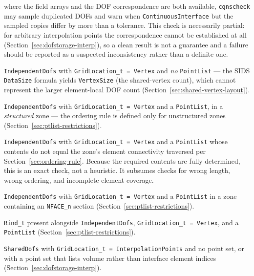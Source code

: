 \documentclass[11pt,letterpaper]{article}
\begin{document}
\begin{description}[leftmargin=2em]
\item[Warning, optional and off by default:] where the field arrays and
  the DOF correspondence are both available, \texttt{cgnscheck} may
  sample duplicated DOFs and warn when
  \texttt{ContinuousInterface} but the sampled copies
  differ by more than a tolerance.  This check is necessarily partial:
  for arbitrary interpolation points the correspondence cannot be
  established at all (Section~\ref{sec:dofstorage-interp}), so a clean
  result is not a guarantee and a failure should be reported as a
  suspected inconsistency rather than a definite one.

\item[Error:] \texttt{IndependentDofs} with
  \texttt{GridLocation\_t = Vertex} and \emph{no}
  \texttt{PointList} --- the SIDS \texttt{DataSize} formula yields
  \texttt{VertexSize} (the shared-vertex count), which cannot
  represent the larger element-local DOF count
  (Section~\ref{sec:shared-vertex-layout}).

\item[Error:] \texttt{IndependentDofs} with
  \texttt{GridLocation\_t = Vertex} and a \texttt{PointList}, in a
  \emph{structured} zone --- the ordering rule is defined only for
  unstructured zones (Section~\ref{sec:ptlist-restrictions}).

\item[Error:] \texttt{IndependentDofs} with
  \texttt{GridLocation\_t = Vertex} and a \texttt{PointList} whose
  contents do not equal the zone's element connectivity traversed per
  Section~\ref{sec:ordering-rule}.  Because the required contents are
  fully determined, this is an exact check, not a heuristic.  It
  subsumes checks for wrong length, wrong ordering, and incomplete
  element coverage.

\item[Error:] \texttt{IndependentDofs} with
  \texttt{GridLocation\_t = Vertex} and a \texttt{PointList} in a zone
  containing an \texttt{NFACE\_n} section
  (Section~\ref{sec:ptlist-restrictions}).

\item[Error:] \texttt{Rind\_t} present alongside
  \texttt{IndependentDofs},
  \texttt{GridLocation\_t = Vertex}, and a \texttt{PointList}
  (Section~\ref{sec:ptlist-restrictions}).

\item[Error:] \texttt{SharedDofs} with
  \texttt{GridLocation\_t = InterpolationPoints} and no point set, or
  with a point set that lists volume rather than interface element
  indices (Section~\ref{sec:dofstorage-interp}).


\end{description}
\end{document}

